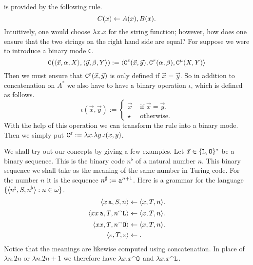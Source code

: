 is provided by the following rule.
\begin{equation}
C(x) \leftarrow A(x), B(x).
\end{equation}
Intuitively, one would choose $\lambda x.x$ for the string
function; however, how does one ensure that the two strings
on the right hand side are equal? For suppose we were
to introduce a binary mode {\tt C}.
\begin{equation}
\mbox{\tt C}(\langle \vec{x},\alpha,X\rangle, \langle \vec{y},\beta,Y\rangle)
:= \langle \mbox{\tt C}^{\varepsilon}(\vec{x},\vec{y}),
    \mbox{\tt C}^{\tau}(\alpha,\beta),
    \mbox{\tt C}^{\mu}(X,Y)\rangle
\end{equation}
Then we must ensure that
$\mbox{\tt C}^{\varepsilon}(\vec{x},\vec{y})$ is only defined
if $\vec{x} = \vec{y}$. So in addition to concatenation on $A^{\ast}$ 
we also have to have a binary operation $\iota$, which is defined 
as follows.
\begin{equation}
\iota(\vec{x}, \vec{y}) := 
	\begin{cases}
    \vec{x} & \text{ if $\vec{x} = \vec{y}$,} \\
    \star   & \text{ otherwise.}
    	\end{cases}
\end{equation}
With the help of this operation we can transform the rule
into a binary mode. Then we simply put $\mbox{\tt %
C}^{\varepsilon} := \lambda x.\lambda y.\iota(x,y)$.

We shall try out our concepts by giving a few examples.
Let $\vec{x} \in \{\mbox{\tt L}, \mbox{\tt O}\}^{\ast}$ be
a binary sequence. This is the binary code $n^{\flat}$ of a
natural number $n$. This binary sequence we shall take as the
meaning of the same number in Turing code. For the number $n$ 
it is the sequence $n^{\sharp} := \mbox{\tt a}^{n+1}$. Here
is a grammar for the language $\{\langle n^{\sharp}, S, n^{\flat}\rangle
: n \in \omega\}$.
\begin{equation}
\begin{split} 
\langle x \, \mbox{\tt a}, S, n\rangle & \leftarrow
    \langle x, T, n\rangle. \\
\langle xx \, \mbox{\tt a}, T, n {^{\smallfrown}} \mbox{\tt L}\rangle  & \leftarrow
    \langle x, T, n\rangle. \\
\langle xx, T, n {^{\smallfrown}} \mbox{\tt O}\rangle  & \leftarrow
    \langle x, T, n\rangle. \\
\langle \varepsilon, T, \varepsilon\rangle & \leftarrow.
\end{split}
\end{equation}
Notice that the meanings are likewise computed using concatenation.
In place of $\lambda n.2n$ or $\lambda n.2n+1$ we therefore have
$\lambda x.x {^{\smallfrown}} \mbox{\tt O}$ and
$\lambda x.x {^{\smallfrown}} \mbox{\tt L}$.

